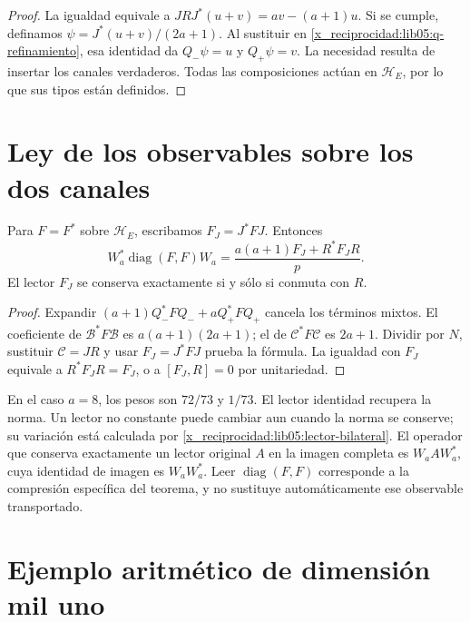 \begin{proof}
La igualdad equivale a
\(JRJ^*(u+v)=av-(a+1)u\). Si se cumple, definamos
\(\psi=J^*(u+v)/(2a+1)\). Al sustituir en
\eqref{x_reciprocidad:lib05:q-refinamiento}, esa identidad da
\(Q_-\psi=u\) y \(Q_+\psi=v\). La necesidad resulta de
insertar los canales verdaderos. Todas las composiciones actúan
en \(\mathscr H_E\), por lo que sus tipos están definidos.
\end{proof}

\section{Ley de los observables sobre los dos canales}
\label{x_reciprocidad:lib05:ley-lectores}

\begin{theorem}
\label{x_reciprocidad:lib05:teo-lector}
Para \(F=F^*\) sobre \(\mathscr H_E\), escribamos
\(F_J=J^*FJ\). Entonces
\begin{equation}
 W_a^*\operatorname{diag}(F,F)W_a
 =\frac{a(a+1)F_J+R^*F_JR}{p}.
 \label{x_reciprocidad:lib05:lector-bilateral}
\end{equation}
El lector \(F_J\) se conserva exactamente si y sólo si conmuta
con \(R\).
\end{theorem}

\begin{proof}
Expandir \((a+1)Q_-^*FQ_-+aQ_+^*FQ_+\) cancela los
términos mixtos. El coeficiente de \(\mathcal B^*F\mathcal B\)
es \(a(a+1)(2a+1)\); el de
\(\mathcal C^*F\mathcal C\) es \(2a+1\). Dividir por
\(N\), sustituir \(\mathcal C=JR\) y usar
\(F_J=J^*FJ\) prueba la fórmula. La igualdad con \(F_J\)
equivale a \(R^*F_JR=F_J\), o a \([F_J,R]=0\) por
unitariedad.
\end{proof}

En el caso \(a=8\), los pesos son \(72/73\) y \(1/73\).
El lector identidad recupera la norma. Un lector no constante
puede cambiar aun cuando la norma se conserve; su variación está
calculada por \eqref{x_reciprocidad:lib05:lector-bilateral}.
El operador que conserva exactamente un lector original \(A\)
en la imagen completa es \(W_aAW_a^*\), cuya identidad de imagen
es \(W_aW_a^*\). Leer \(\operatorname{diag}(F,F)\) corresponde
a la compresión específica del teorema, y no sustituye
automáticamente ese observable transportado.

\section{Ejemplo aritmético de dimensión mil uno}
\label{x_reciprocidad:lib05:ejemplo}

